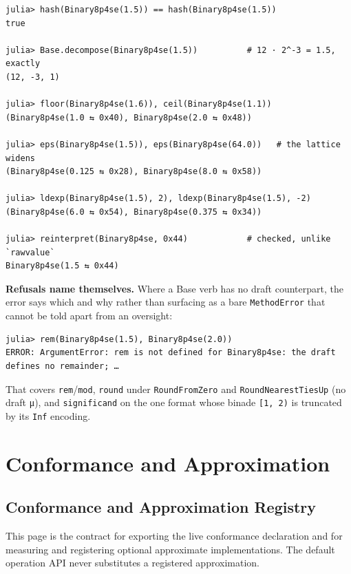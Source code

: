 \begin{verbatim}
julia> hash(Binary8p4se(1.5)) == hash(Binary8p4se(1.5))
true

julia> Base.decompose(Binary8p4se(1.5))          # 12 · 2^-3 = 1.5, exactly
(12, -3, 1)

julia> floor(Binary8p4se(1.6)), ceil(Binary8p4se(1.1))
(Binary8p4se(1.0 ⇆ 0x40), Binary8p4se(2.0 ⇆ 0x48))

julia> eps(Binary8p4se(1.5)), eps(Binary8p4se(64.0))   # the lattice widens
(Binary8p4se(0.125 ⇆ 0x28), Binary8p4se(8.0 ⇆ 0x58))

julia> ldexp(Binary8p4se(1.5), 2), ldexp(Binary8p4se(1.5), -2)
(Binary8p4se(6.0 ⇆ 0x54), Binary8p4se(0.375 ⇆ 0x34))

julia> reinterpret(Binary8p4se, 0x44)            # checked, unlike `rawvalue`
Binary8p4se(1.5 ⇆ 0x44)
\end{verbatim}



\textbf{Refusals name themselves.} Where a Base verb has no draft counterpart, the error says which and why rather than surfacing as a bare \texttt{MethodError} that cannot be told apart from an oversight:




\nopagebreak[4]
\begin{verbatim}
julia> rem(Binary8p4se(1.5), Binary8p4se(2.0))
ERROR: ArgumentError: rem is not defined for Binary8p4se: the draft defines no remainder; …
\end{verbatim}



That covers \texttt{rem}/\allowbreak\texttt{mod}, \texttt{round} under \texttt{RoundFromZero} and \texttt{RoundNearestTiesUp} (no draft μ), and \texttt{significand} on the one format whose binade \texttt{[1, 2)} is truncated by its \texttt{Inf} encoding.



\chapter{Conformance and Approximation}


\section{Conformance and Approximation Registry}



\label{16001945251449732739}{}


This page is the contract for exporting the live conformance declaration and for measuring and registering optional approximate implementations. The default operation API never substitutes a registered approximation.



